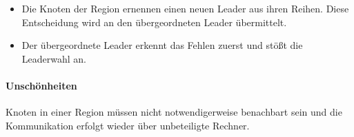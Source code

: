 \begin{itemize}
\item Die Knoten der Region ernennen einen neuen Leader aus ihren Reihen. Diese Entscheidung wird an den übergeordneten Leader übermittelt.
\item Der übergeordnete Leader erkennt das Fehlen zuerst und stößt die Leaderwahl an.
\end{itemize}

\paragraph{Unschönheiten}
Knoten in einer Region müssen nicht notwendigerweise benachbart sein und die Kommunikation erfolgt wieder über unbeteiligte Rechner.
